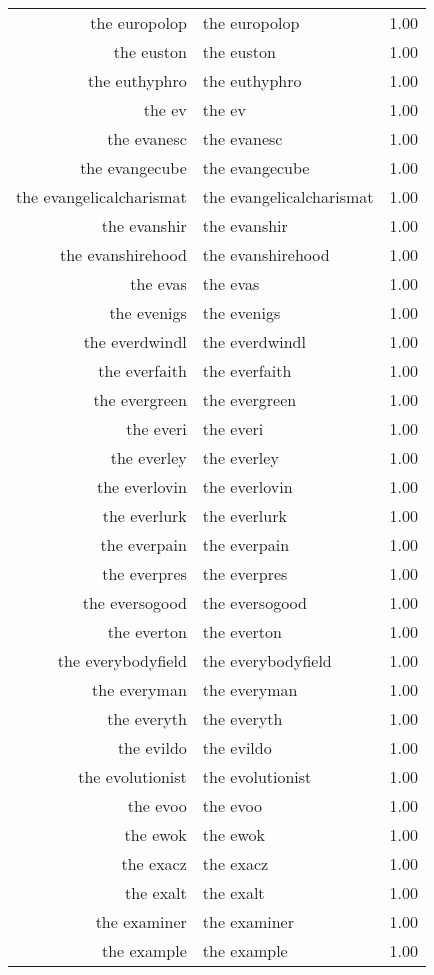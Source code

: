\begin{table}[ht]
\begin{tabular}{rlr}
  the europolop & the europolop & 1.00 \\ 
  the euston & the euston & 1.00 \\ 
  the euthyphro & the euthyphro & 1.00 \\ 
  the ev & the ev & 1.00 \\ 
  the evanesc & the evanesc & 1.00 \\ 
  the evangecube & the evangecube & 1.00 \\ 
  the evangelicalcharismat & the evangelicalcharismat & 1.00 \\ 
  the evanshir & the evanshir & 1.00 \\ 
  the evanshirehood & the evanshirehood & 1.00 \\ 
  the evas & the evas & 1.00 \\ 
  the evenigs & the evenigs & 1.00 \\ 
  the everdwindl & the everdwindl & 1.00 \\ 
  the everfaith & the everfaith & 1.00 \\ 
  the evergreen & the evergreen & 1.00 \\ 
  the everi & the everi & 1.00 \\ 
  the everley & the everley & 1.00 \\ 
  the everlovin & the everlovin & 1.00 \\ 
  the everlurk & the everlurk & 1.00 \\ 
  the everpain & the everpain & 1.00 \\ 
  the everpres & the everpres & 1.00 \\ 
  the eversogood & the eversogood & 1.00 \\ 
  the everton & the everton & 1.00 \\ 
  the everybodyfield & the everybodyfield & 1.00 \\ 
  the everyman & the everyman & 1.00 \\ 
  the everyth & the everyth & 1.00 \\ 
  the evildo & the evildo & 1.00 \\ 
  the evolutionist & the evolutionist & 1.00 \\ 
  the evoo & the evoo & 1.00 \\ 
  the ewok & the ewok & 1.00 \\ 
  the exacz & the exacz & 1.00 \\ 
  the exalt & the exalt & 1.00 \\ 
  the examiner & the examiner & 1.00 \\ 
  the example & the example & 1.00 \\ 

\end{tabular}
\end{table}
